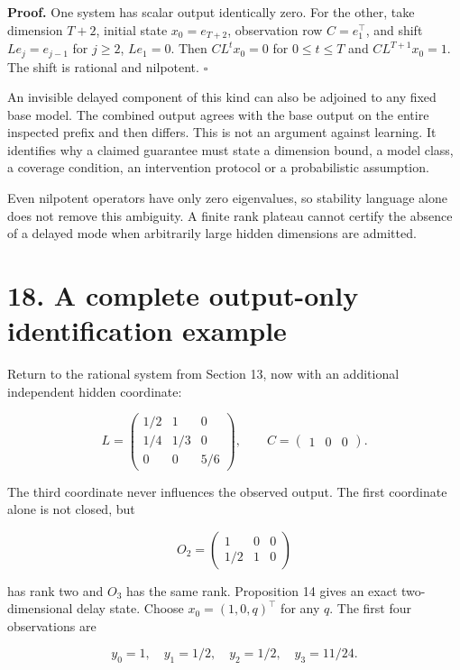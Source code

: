 \documentclass[11pt,letterpaper]{article}
\begin{document}
\textbf{Proof.} One system has scalar output identically zero. For the
other, take dimension \(T+2\), initial state \(x_0=e_{T+2}\),
observation row \(C=e_1^\top\), and shift \(Le_j=e_{j-1}\) for
\(j\geq2\), \(Le_1=0\). Then \(CL^tx_0=0\) for \(0\leq t\leq T\) and
\(CL^{T+1}x_0=1\). The shift is rational and nilpotent. \(\square\)

An invisible delayed component of this kind can also be adjoined to any
fixed base model. The combined output agrees with the base output on the
entire inspected prefix and then differs. This is not an argument
against learning. It identifies why a claimed guarantee must state a
dimension bound, a model class, a coverage condition, an intervention
protocol or a probabilistic assumption.

Even nilpotent operators have only zero eigenvalues, so stability
language alone does not remove this ambiguity. A finite rank plateau
cannot certify the absence of a delayed mode when arbitrarily large
hidden dimensions are admitted.

\section{18. A complete output-only identification
example}\label{a-complete-output-only-identification-example}

Return to the rational system from Section 13, now with an additional
independent hidden coordinate:

\[
L=\begin{pmatrix}
1/2&1&0\\
1/4&1/3&0\\
0&0&5/6
\end{pmatrix},
\qquad C=\begin{pmatrix}1&0&0\end{pmatrix}.
\]

The third coordinate never influences the observed output. The first
coordinate alone is not closed, but

\[
O_2=\begin{pmatrix}1&0&0\\1/2&1&0\end{pmatrix}
\]

has rank two and \(O_3\) has the same rank. Proposition 14 gives an
exact two-dimensional delay state. Choose \(x_0=(1,0,q)^\top\) for any
\(q\). The first four observations are

\[
y_0=1,\quad y_1=1/2,\quad y_2=1/2,\quad y_3=11/24.
\]
\end{document}
